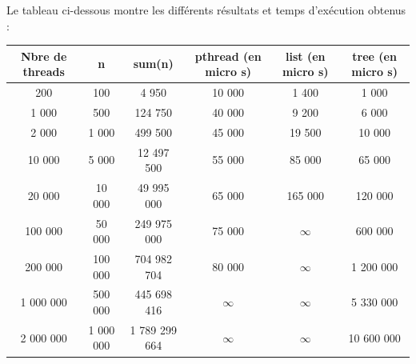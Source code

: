 Le tableau ci-dessous montre les différents résultats et temps
d'exécution obtenus : \\
\begin{tabular}{|c|c|c|c|c|c|}
  \hline Nbre de threads & n & sum(n) & pthread (en micro s) & list
  (en micro s) & tree (en micro s)\\ \hline 200 & 100 & 4 950 & 10 000
  & 1 400 & 1 000 \\ 1 000 & 500 & 124 750 & 40 000 & 9 200 & 6 000
  \\ 2 000 & 1 000 & 499 500 & 45 000 & 19 500 & 10 000 \\ 10 000 & 5
  000 & 12 497 500 & 55 000 & 85 000 & 65 000 \\ 20 000 & 10 000 & 49
  995 000 & 65 000 & 165 000 & 120 000 \\ 100 000 & 50 000 & 249 975
  000 & 75 000 & $\infty$& 600 000 \\ 200 000 & 100 000 & 704 982 704 &
  80 000 &$\infty$ & 1 200 000 \\ 1 000 000 & 500 000 & 445 698 416
  &$\infty$ &$\infty$ & 5 330 000 \\ 2 000 000 & 1 000 000 & 1 789 299 664
  &$\infty$ &$\infty$ & 10 600 000 \\ \hline
\end{tabular}

\begin{center}
\end{center}

